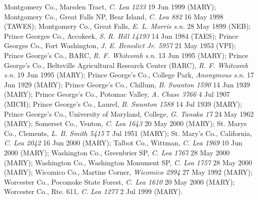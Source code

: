 \documentclass{article}
\begin{document}
Montgomery Co., Marsden Tract, \textit{C. Lea 1233} 19 Jun 1999 (MARY);
Montgomery Co., Great Falls NP, Bear Island, \textit{C. Lea 882} 16 May 1998 (TAWES);
Montgomery Co., Great Falls, \textit{E. L. Morris s.n.} 28 May 1899 (NEB);
Prince Georges Co., Accokeek, \textit{S. R. Hill 14193} 14 Jun 1984 (TAES);
Prince Georges Co., Fort Washington, \textit{J. E. Benedict Jr. 5957} 21 May 1953 (VPI);
Prince George's Co., BARC, \textit{R. F. Whitcomb s.n.} 13 Jun 1995 (MARY);
Prince George's Co., Beltsville Agricultural Research Center (BARC), \textit{R. F. Whitcomb s.n.} 19 Jun 1995 (MARY);
Prince George's Co., College Park, \textit{Anonymous s.n.} 17 Jun 1929 (MARY);
Prince George's Co., Chillum, \textit{B. Swanton 1590} 14 Jun 1939 (MARY);
Prince George's Co., Potomac Valley, \textit{A. Chase 3766} 4 Jul 1907 (MICH);
Prince George's Co., Laurel, \textit{B. Swanton 1588} 14 Jul 1939 (MARY);
Prince George's Co., University of Maryland, College, \textit{G. Tanaka 17} 24 May 1962 (MARY);
Somerset Co., Venton, \textit{C. Lea 1643} 20 May 2000 (MARY);
St. Marys Co., Clements, \textit{L. B. Smith 5415} 7 Jul 1951 (MARY);
St. Mary's Co., California, \textit{C. Lea 2042} 16 Jun 2000 (MARY);
Talbot Co., Wittman, \textit{C. Lea 1969} 10 Jun 2000 (MARY);
Washington Co., Greenbrier SP, \textit{C. Lea 1767} 28 May 2000 (MARY);
Washington Co., Washington Monument SP, \textit{C. Lea 1757} 28 May 2000 (MARY);
Wicomico Co., Martins Corner, \textit{Wicomico 2994} 27 May 1992 (MARY);
Worcester Co., Pocomoke State Forest, \textit{C. Lea 1610} 20 May 2000 (MARY);
Worcester Co., Rte. 611, \textit{C. Lea 1277} 2 Jul 1999 (MARY).
\end{document}
